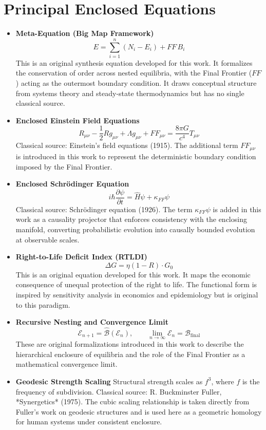 \section{Principal Enclosed Equations}

\begin{itemize}

\item \textbf{Meta-Equation (Big Map Framework)}  
\[
E = \sum_{i=1}^n (N_i - E_i) + FF \, B_i
\]  
This is an original synthesis equation developed for this work. It formalizes the conservation of order across nested equilibria, with the Final Frontier (\(FF\)) acting as the outermost boundary condition. It draws conceptual structure from systems theory and steady-state thermodynamics but has no single classical source.

\item \textbf{Enclosed Einstein Field Equations}  
\[
R_{\mu\nu} - \frac{1}{2} R g_{\mu\nu} + \Lambda g_{\mu\nu} + FF_{\mu\nu} = \frac{8\pi G}{c^4} T_{\mu\nu}
\]  
Classical source: Einstein’s field equations (1915). The additional term \(FF_{\mu\nu}\) is introduced in this work to represent the deterministic boundary condition imposed by the Final Frontier.

\item \textbf{Enclosed Schrödinger Equation}  
\[
i \hbar \frac{\partial \psi}{\partial t} = \hat{H} \psi + \kappa_{FF} \psi
\]  
Classical source: Schrödinger equation (1926). The term \(\kappa_{FF} \psi\) is added in this work as a causality projector that enforces consistency with the enclosing manifold, converting probabilistic evolution into causally bounded evolution at observable scales.

\item \textbf{Right-to-Life Deficit Index (RTLDI)}  
\[
\Delta G = \eta (1 - R) \cdot G_0
\]  
This is an original equation developed for this work. It maps the economic consequence of unequal protection of the right to life. The functional form is inspired by sensitivity analysis in economics and epidemiology but is original to this paradigm.

\item \textbf{Recursive Nesting and Convergence Limit}  
\[
\mathcal{E}_{n+1} = \hat{\mathcal{B}}(\mathcal{E}_n), \qquad \lim_{n \to \infty} \mathcal{E}_n = \mathcal{B}_{\text{final}}
\]  
These are original formalizations introduced in this work to describe the hierarchical enclosure of equilibria and the role of the Final Frontier as a mathematical convergence limit.

\item \textbf{Geodesic Strength Scaling}  
Structural strength scales as $f^3$, where $f$ is the frequency of subdivision.  
Classical source: R. Buckminster Fuller, *Synergetics* (1975). The cubic scaling relationship is taken directly from Fuller’s work on geodesic structures and is used here as a geometric homology for human systems under consistent enclosure.

\end{itemize}

